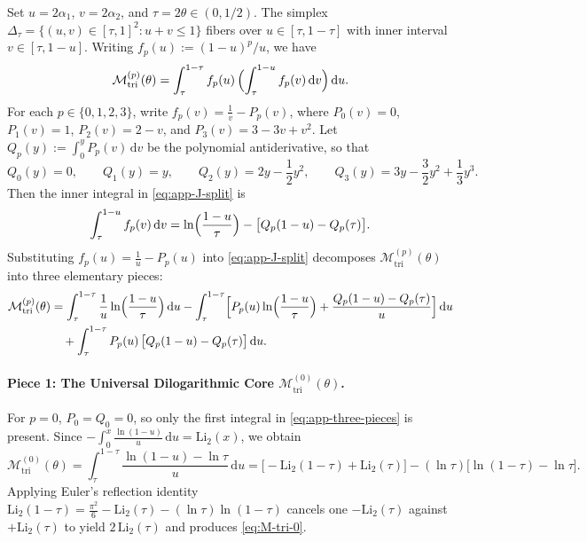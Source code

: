 \documentclass[11pt,reqno]{amsart}
\theoremstyle{definition}
\theoremstyle{remark}
\numberwithin{equation}{section}
\newcommand{\dd}{\mathrm{d}}
\newcommand{\Li}{\mathrm{Li}}
\newcommand{\tri}{\mathrm{tri}}
\begin{document}
Set $u = 2\alpha_1$, $v = 2\alpha_2$, and $\tau = 2\theta \in (0,1/2)$. The simplex $\Delta_\tau = \{(u,v) \in [\tau,1]^2 : u+v \le 1\}$ fibers over $u \in [\tau, 1-\tau]$ with inner interval $v \in [\tau, 1-u]$. Writing $f_p(u) := (1-u)^p/u$, we have
\begin{equation}\label{eq:app-J-split}
\mathcal{M}_{\tri}^{(p)}(\theta) = \int_{\tau}^{1-\tau} f_p(u)\,\Bigl(\int_{\tau}^{1-u} f_p(v)\,\dd v\Bigr)\,\dd u.
\end{equation}
For each $p \in \{0,1,2,3\}$, write $f_p(v) = \frac{1}{v} - P_p(v)$, where $P_0(v) = 0$, $P_1(v) = 1$, $P_2(v) = 2 - v$, and $P_3(v) = 3 - 3v + v^2$. Let $Q_p(y) := \int_0^y P_p(v)\,\dd v$ be the polynomial antiderivative, so that
\[
Q_0(y) = 0, \qquad Q_1(y) = y, \qquad Q_2(y) = 2y - \frac{1}{2}y^2, \qquad Q_3(y) = 3y - \frac{3}{2}y^2 + \frac{1}{3}y^3.
\]
Then the inner integral in \eqref{eq:app-J-split} is
\[
\int_{\tau}^{1-u} f_p(v)\,\dd v = \ln\Bigl(\frac{1-u}{\tau}\Bigr) - \bigl[Q_p(1-u) - Q_p(\tau)\bigr].
\]
Substituting $f_p(u) = \frac{1}{u} - P_p(u)$ into \eqref{eq:app-J-split} decomposes $\mathcal{M}_{\tri}^{(p)}(\theta)$ into three elementary pieces:
\begin{align}
\mathcal{M}_{\tri}^{(p)}(\theta) &= \int_{\tau}^{1-\tau} \frac{1}{u}\ln\Bigl(\frac{1-u}{\tau}\Bigr)\,\dd u - \int_{\tau}^{1-\tau} \Bigl[P_p(u)\ln\Bigl(\frac{1-u}{\tau}\Bigr) + \frac{Q_p(1-u) - Q_p(\tau)}{u}\Bigr]\,\dd u \nonumber\\
&\quad + \int_{\tau}^{1-\tau} P_p(u)\,\bigl[Q_p(1-u) - Q_p(\tau)\bigr]\,\dd u. \label{eq:app-three-pieces}
\end{align}

\paragraph{\textbf{Piece 1: The Universal Dilogarithmic Core $\mathcal{M}_{\tri}^{(0)}(\theta)$.}}
For $p=0$, $P_0 = Q_0 = 0$, so only the first integral in \eqref{eq:app-three-pieces} is present. Since $-\int_0^x \frac{\ln(1-u)}{u}\,\dd u = \Li_2(x)$, we obtain
\[
\mathcal{M}_{\tri}^{(0)}(\theta) = \int_{\tau}^{1-\tau} \frac{\ln(1-u) - \ln\tau}{u}\,\dd u = \bigl[-\Li_2(1-\tau) + \Li_2(\tau)\bigr] - (\ln\tau)\bigl[\ln(1-\tau) - \ln\tau\bigr].
\]
Applying Euler's reflection identity $\Li_2(1-\tau) = \frac{\pi^2}{6} - \Li_2(\tau) - (\ln\tau)\ln(1-\tau)$ \cite{Lewin1981} cancels one $-\Li_2(\tau)$ against $+\Li_2(\tau)$ to yield $2\,\Li_2(\tau)$ and produces \eqref{eq:M-tri-0}.
\end{document}
